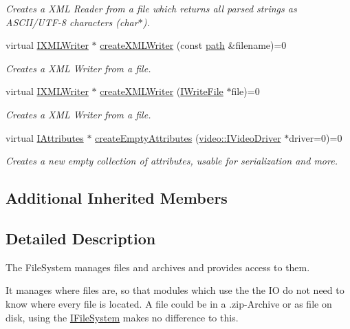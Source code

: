 \begin{DoxyCompactItemize}
\begin{DoxyCompactList}\small\item\em Creates a X\+ML Reader from a file which returns all parsed strings as A\+S\+C\+I\+I/\+U\+T\+F-\/8 characters (char$\ast$). \end{DoxyCompactList}\item 
virtual \hyperlink{classirr_1_1io_1_1IXMLWriter}{I\+X\+M\+L\+Writer} $\ast$ \hyperlink{classirr_1_1io_1_1IFileSystem_a0737712d1c90001e5765ef46912c616d}{create\+X\+M\+L\+Writer} (const \hyperlink{namespaceirr_1_1io_ab1bdc45edb3f94d8319c02bc0f840ee1}{path} \&filename)=0
\begin{DoxyCompactList}\small\item\em Creates a X\+ML Writer from a file. \end{DoxyCompactList}\item 
virtual \hyperlink{classirr_1_1io_1_1IXMLWriter}{I\+X\+M\+L\+Writer} $\ast$ \hyperlink{classirr_1_1io_1_1IFileSystem_ac2bcaf8c338e80ff579061b7056c06da}{create\+X\+M\+L\+Writer} (\hyperlink{classirr_1_1io_1_1IWriteFile}{I\+Write\+File} $\ast$file)=0
\begin{DoxyCompactList}\small\item\em Creates a X\+ML Writer from a file. \end{DoxyCompactList}\item 
virtual \hyperlink{classirr_1_1io_1_1IAttributes}{I\+Attributes} $\ast$ \hyperlink{classirr_1_1io_1_1IFileSystem_a50f91cd88b926751367dac153c1cefd2}{create\+Empty\+Attributes} (\hyperlink{classirr_1_1video_1_1IVideoDriver}{video\+::\+I\+Video\+Driver} $\ast$driver=0)=0
\begin{DoxyCompactList}\small\item\em Creates a new empty collection of attributes, usable for serialization and more. \end{DoxyCompactList}\end{DoxyCompactItemize}
\subsection*{Additional Inherited Members}


\subsection{Detailed Description}
The File\+System manages files and archives and provides access to them. 

It manages where files are, so that modules which use the the IO do not need to know where every file is located. A file could be in a .zip-\/\+Archive or as file on disk, using the \hyperlink{classirr_1_1io_1_1IFileSystem}{I\+File\+System} makes no difference to this. 

